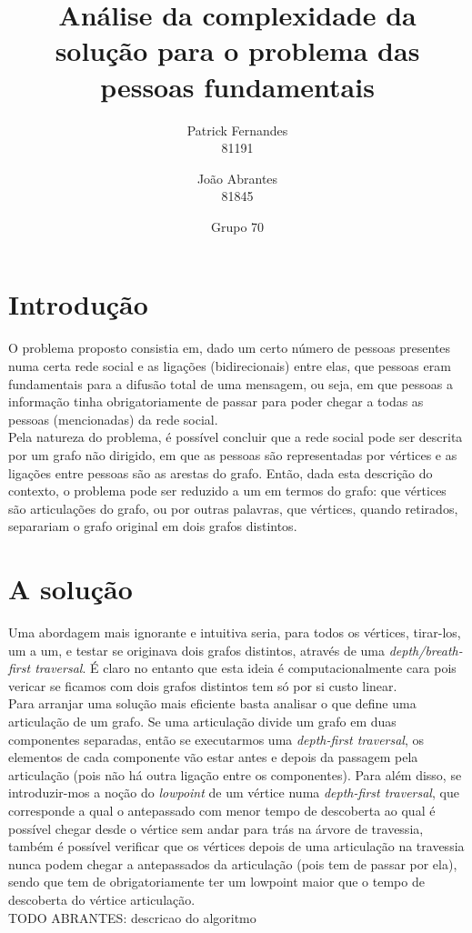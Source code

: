 \documentclass[12pt]{article}
\title{Análise da complexidade da solução para o problema das pessoas fundamentais}
\author{Patrick Fernandes\\81191 \and João Abrantes\\81845}
\date{Grupo 70}
\begin{document}
\maketitle
\section{Introdução}
O problema proposto consistia em, dado um certo número de pessoas presentes numa certa rede social e as ligações (bidirecionais) entre elas, que pessoas eram fundamentais para a difusão total de uma mensagem, ou seja, em que pessoas a informação tinha obrigatoriamente de passar para poder chegar a todas as pessoas (mencionadas) da rede social.\\
Pela natureza do problema, é possível concluir que a rede social pode ser descrita por um grafo não dirigido, em que as pessoas são representadas por vértices e as ligações entre pessoas são as arestas do grafo. Então, dada esta descrição do contexto, o problema pode ser reduzido a um em termos do grafo: que vértices são articulações do grafo, ou por outras palavras, que vértices, quando retirados, separariam o grafo original em dois grafos distintos.
\section{A solução}
Uma abordagem mais ignorante e intuitiva seria, para todos os vértices, tirar-los, um a um, e testar se originava dois grafos distintos, através de uma \textit{depth/breath-first traversal}. É claro no entanto que esta ideia é computacionalmente cara pois vericar se ficamos com dois grafos distintos tem só por si custo linear. \\ 
Para arranjar uma solução mais eficiente basta analisar o que define uma articulação de um grafo. Se uma articulação divide um grafo em duas componentes separadas, então se executarmos uma \textit{depth-first traversal}, os elementos de cada componente vão estar antes e depois da passagem pela articulação (pois não há outra ligação entre os componentes). Para além disso, se introduzir-mos a noção do \textit{lowpoint} de um vértice numa \textit{depth-first traversal}, que corresponde a qual o antepassado com menor tempo de descoberta ao qual é possível chegar desde o vértice sem andar para trás na árvore de travessia, também é possível verificar que os vértices depois de uma articulação na travessia nunca podem chegar a antepassados da articulação (pois tem de passar por ela), sendo que tem de obrigatoriamente ter um lowpoint maior que o tempo de descoberta do vértice articulação.\\
TODO ABRANTES: descricao do algoritmo
\end{document}
